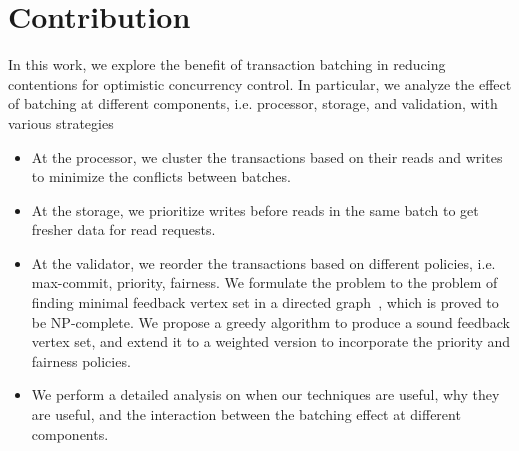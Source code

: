 \section{Contribution}
In this work, we explore the benefit of transaction batching in reducing contentions for optimistic concurrency control.  
In particular, we analyze the effect of batching at different components, i.e. processor, storage, and validation, with various strategies
\begin{itemize}
\item At the processor, we cluster the transactions based on their reads and writes to minimize the conflicts between batches. 
\item At the storage, we prioritize writes before reads in the same batch to get fresher data for read requests.
\item At the validator, we reorder the transactions based on different policies, i.e. max-commit, priority, fairness. We formulate the problem to the problem of finding minimal feedback vertex set in a directed graph~\cite{karp1972reducibility}, which is proved to be NP-complete. We propose a greedy algorithm to produce a sound feedback vertex set, and extend it to a weighted version to incorporate the priority and fairness policies.
\item We perform a detailed analysis on when our techniques are useful, why they are useful, and the interaction between the batching effect at different components.
\end{itemize} 
